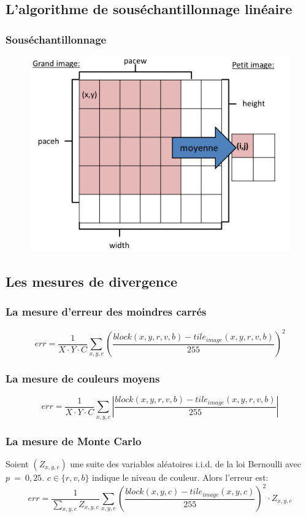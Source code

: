 \documentclass[handout]{beamer}
\begin{document}
\subsection{L'algorithme de sous\'echantillonnage lin\'eaire}
\begin{frame}
\frametitle{\bf Sous\'echantillonnage}
\begin{figure}[H]
\includegraphics[scale=0.36]{scale_to.png}
\end{figure}
\end{frame}


\subsection{Les mesures de divergence}

\begin{frame}
\frametitle{\bf La mesure d'erreur des moindres carr\'es}
\begin{equation*}
err=\frac{1}{X\cdot Y\cdot C}\sum_{x,y,c}\left(\frac{block(x,y,r,v,b)-tile_{image}(x,y,r,v,b)}{255}\right)^2
\end{equation*}
\end{frame}

\begin{frame}
\frametitle{\bf La mesure de couleurs moyens}
\begin{equation*}
err=\frac{1}{X\cdot Y\cdot C}\sum_{x,y,c}\left|\frac{block(x,y,r,v,b)-tile_{image}(x,y,r,v,b)}{255}\right|
\end{equation*}
\end{frame}
\begin{frame}
\frametitle{\bf La mesure de Monte Carlo}
Soient $(Z_{x,y,c})$ une suite des variables al\'eatoires i.i.d. de la loi Bernoulli avec $p~=~0,25$.
$c\in \{r,v,b\}$ indique le niveau de couleur.
Alors l'erreur est:
\begin{equation*}
err=\frac{1}{\sum_{x,y,c}Z_{x,y,c}}\sum_{x,y,c}\left(\frac{block(x,y,c)-tile_{image}(x,y,c)}{255}\right)^2\cdot Z_{x,y,c}
\end{equation*}
\end{frame}
\end{document}

